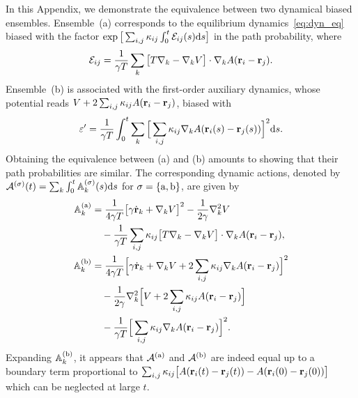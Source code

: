 \documentclass[superscriptaddress, twocolumn, prx, longbibliography, nofootinbib]{revtex4-1}
\begin{document}
In this Appendix, we demonstrate the equivalence between two dynamical biased ensembles. Ensemble~(a) corresponds to the equilibrium dynamics~\eqref{eq:dyn_eq} biased with the factor $\exp\big[\sum_{i,j} \kappa_{ij}\int_0^t{\cal E}_{ij}(s){\rm d}s\big]$ in the path probability, where
\begin{equation}
	{\cal E}_{ij} = \frac{1}{\gamma T} \sum_k\big[T\nabla_k - \nabla_kV\big]\cdot\nabla_k A({\bf r}_i-{\bf r}_j) .
\end{equation}
Ensemble~(b) is associated with the first-order auxiliary dynamics, whose potential reads $V+2\sum_{i,j}\kappa_{ij}A({\bf r}_i-{\bf r}_j)$, biased with
\begin{equation}
	\varepsilon' = \frac{1}{\gamma T}\int_0^t\sum_k\Big[\sum_{i,j}\kappa_{ij} \nabla_kA({\bf r}_i(s)-{\bf r}_j(s))\Big]^2{\rm d}s .
\end{equation}
Obtaining the equivalence between (a) and (b) amounts to showing that their path probabilities are similar. The corresponding dynamic actions, denoted by ${\cal A}^{( \sigma)}(t) = \sum_k\int_0^t{\mathbb A}_k^{(\sigma)}(s){\rm d}s$ for $\sigma=\{{\rm a,b}\}$, are given by
\begin{equation}
	\begin{aligned}
		{\mathbb A}_k^{(\rm a)} &= \frac{1}{4\gamma T} \big[\gamma\dot{\bf r}_k + \nabla_kV\big]^2 - \frac{1}{2\gamma} \nabla^2_kV
		\\
		&\quad - \frac{1}{\gamma T} \sum_{i,j}\kappa_{ij}\big[T \nabla_k - \nabla_k V\big] \cdot\nabla_k A({\bf r}_i-{\bf r}_j) ,
		\\
		{\mathbb A}_k^{(\rm b)}	&= \frac{1}{4\gamma T} \Big[\gamma\dot{\bf r}_k + \nabla_k V + 2\sum_{i,j}\kappa_{ij}\nabla_kA({\bf r}_i-{\bf r}_j)\Big]^2
		\\
		&\quad - \frac{1}{2\gamma} \nabla^2_k \Big[V + 2\sum_{i,j}\kappa_{ij} A({\bf r}_i-{\bf r}_j)\Big]
		\\
		&\quad - \frac{1}{\gamma T}\Big[\sum_{i,j}\kappa_{ij}\nabla_kA({\bf r}_i-{\bf r}_j)\Big]^2 .
	\end{aligned}
\end{equation}
Expanding ${\mathbb A}_k^{(\rm b)}$, it appears that ${\cal A}^{(\rm a)}$ and  ${\cal A}^{(\rm b)}$ are indeed equal up to a boundary term proportional to $\sum_{i,j}\kappa_{ij}\big[A({\bf r}_i(t)-{\bf r}_j(t)) - A({\bf r}_i(0)-{\bf r}_j(0))\big]$ which can be neglected at large $t$.




%

\end{document}
